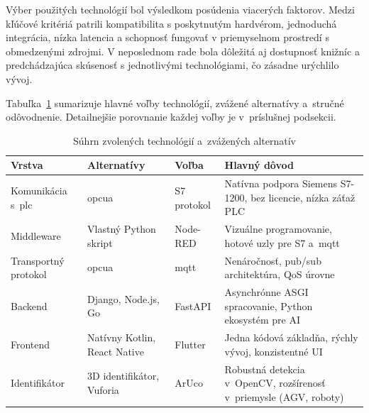 Výber použitých technológií bol výsledkom posúdenia viacerých faktorov. Medzi
kľúčové kritériá patrili kompatibilita s poskytnutým hardvérom, jednoduchá
integrácia, nízka latencia a schopnosť fungovať v priemyselnom prostredí s
obmedzenými zdrojmi. V neposlednom rade bola dôležitá aj dostupnosť knižníc a
predchádzajúca skúsenosť s jednotlivými technológiami, čo zásadne urýchlilo
vývoj.

Tabuľka~\ref{tab:tech_choices} sumarizuje hlavné voľby technológií, zvážené
alternatívy a~stručné odôvodnenie. Detailnejšie porovnanie každej voľby je
v~príslušnej podsekcii.

\begin{table}[H]
      \centering
      \caption{Súhrn zvolených technológií a~zvážených alternatív}
      \label{tab:tech_choices}
      \renewcommand{\arraystretch}{1.3}
      \small
      \begin{tabularx}{\textwidth}{|l|l|l|X|}
            \hline
            \textbf{Vrstva}              & \textbf{Alternatívy}         & \textbf{Voľba}     & \textbf{Hlavný dôvod}                                                  \\
            \hline
            Komunikácia s~\acrshort{plc} & \acrshort{opcua}             & S7 protokol        & Natívna podpora Siemens S7-1200, bez licencie, nízka záťaž PLC         \\
            \hline
            Middleware                   & Vlastný Python skript        & Node-RED           & Vizuálne programovanie, hotové uzly pre S7 a~\acrshort{mqtt}    \\
            \hline
            Transportný protokol         & \acrshort{opcua}             & \acrshort{mqtt}    & Nenáročnosť, pub/sub architektúra, QoS úrovne                          \\
            \hline
            Backend                      & Django, Node.js, Go          & FastAPI            & Asynchrónne ASGI spracovanie, Python ekosystém pre AI                  \\
            \hline
            Frontend                     & Natívny Kotlin, React Native & Flutter            & Jedna kódová základňa, rýchly vývoj, konzistentné UI                   \\
            \hline
            Identifikátor                & 3D identifikátor, Vuforia    & ArUco              & Robustná detekcia v~OpenCV, rozšírenosť v~priemysle (AGV, roboty)      \\
            \hline
      \end{tabularx}
\end{table}


